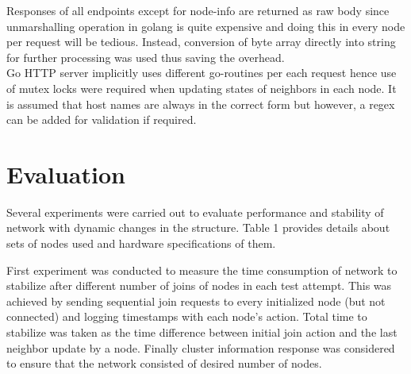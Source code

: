 \documentclass[
    a4paper,
    twocolumn,
]{article}
\begin{document}
Responses of all endpoints except for node-info are returned as raw body since unmarshalling operation in golang is quite expensive and doing this in every node per request will be tedious. Instead, conversion of byte array directly into string for further processing was used thus saving the overhead. \\

Go HTTP server implicitly uses different go-routines per each request hence use of mutex locks were required when updating states of neighbors in each node. It is assumed that host names are always in the correct form but however, a regex can be added for validation if required.

\section{Evaluation}

Several experiments were carried out to evaluate performance and stability of network with dynamic changes in the structure. Table 1 provides details about sets of nodes used and hardware specifications of them.

\begin{table}[!ht]
	\renewcommand{\arraystretch}{1.4}
	\centering
	\caption{Hardware specification of nodes}
\end{table}

First experiment was conducted to measure the time consumption of network to stabilize after different number of joins of nodes in each test attempt. This was achieved by sending sequential join requests to every initialized node (but not connected) and logging timestamps with each node's action. Total time to stabilize was taken as the time difference between initial join action and the last neighbor update by a node. Finally cluster information response was considered to ensure that the network consisted of desired number of nodes.\\
\end{document}
